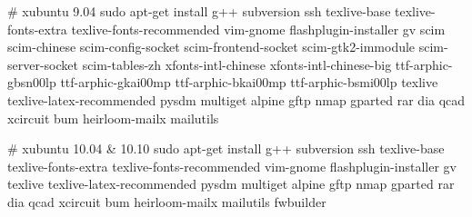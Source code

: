 # xubuntu 9.04
sudo apt-get install g++ subversion ssh texlive-base texlive-fonts-extra texlive-fonts-recommended vim-gnome flashplugin-installer gv scim scim-chinese scim-config-socket scim-frontend-socket scim-gtk2-immodule scim-server-socket scim-tables-zh xfonts-intl-chinese xfonts-intl-chinese-big ttf-arphic-gbsn00lp ttf-arphic-gkai00mp ttf-arphic-bkai00mp ttf-arphic-bsmi00lp texlive texlive-latex-recommended pysdm multiget alpine gftp nmap gparted rar dia qcad xcircuit bum heirloom-mailx mailutils 


# xubuntu 10.04 & 10.10
sudo apt-get install g++ subversion ssh texlive-base texlive-fonts-extra texlive-fonts-recommended vim-gnome flashplugin-installer gv  texlive texlive-latex-recommended pysdm multiget alpine gftp nmap gparted rar dia qcad xcircuit bum heirloom-mailx mailutils fwbuilder


